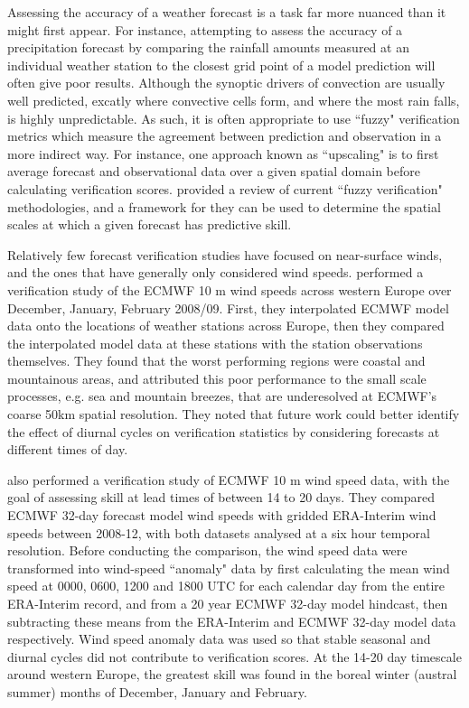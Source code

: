 \documentclass[alpha-refs]{wiley-article}
\begin{document}
Assessing the accuracy of a weather forecast is a task far more nuanced than it might first appear. For instance, attempting to assess the accuracy of a precipitation forecast by comparing the rainfall amounts measured at an individual weather station to the closest grid point of a model prediction will often give poor results. Although the synoptic drivers of convection are usually well predicted, excatly where convective cells form, and where the most rain falls, is highly unpredictable. As such, it is often appropriate to use ``fuzzy" verification metrics which measure the agreement between prediction and observation in a more indirect way. For instance, one approach known as ``upscaling" is to first average forecast and observational data over a given spatial domain before calculating verification scores. \citet{ebert08} provided a review of current ``fuzzy verification" methodologies, and a framework for they can be used to determine the spatial scales at which a given forecast has predictive skill.      

Relatively few forecast verification studies have focused on near-surface winds, and the ones that have generally only considered wind speeds. \citet{pinson12} performed a verification study of the ECMWF 10 m wind speeds across western Europe over December, January, February 2008/09. First, they interpolated ECMWF model data onto the locations of weather stations across Europe, then they compared the interpolated model data at these stations with the station observations themselves. They found that the worst performing regions were coastal and mountainous areas, and attributed this poor performance to the small scale processes, e.g. sea and mountain breezes, that are underesolved at ECMWF's coarse 50km spatial resolution. They noted that future work could better identify the effect of diurnal cycles on verification statistics by considering forecasts at different times of day. 

\citet{lynch14} also performed a verification study of ECMWF 10 m wind speed data, with the goal of assessing skill at lead times of between 14 to 20 days. They compared ECMWF 32-day forecast model wind speeds with gridded ERA-Interim wind speeds between 2008-12, with both datasets analysed at a six hour temporal resolution. Before conducting the comparison, the wind speed data were transformed into wind-speed ``anomaly" data by first calculating the mean wind speed at 0000, 0600, 1200 and 1800 UTC for each calendar day from the entire ERA-Interim record, and from a 20 year ECMWF 32-day model hindcast, then subtracting these means from the ERA-Interim and ECMWF 32-day model data respectively. Wind speed anomaly data was used so that stable seasonal and diurnal cycles did not contribute to verification scores. At the 14-20 day timescale around western Europe, the greatest skill was found in the boreal winter (austral summer) months of December, January and February.  
\end{document}
